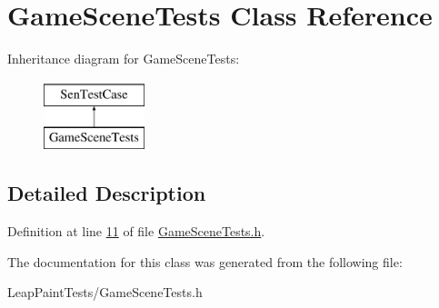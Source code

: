 \hypertarget{interface_game_scene_tests}{\section{Game\-Scene\-Tests Class Reference}
\label{d5/def/interface_game_scene_tests}
}
Inheritance diagram for Game\-Scene\-Tests\-:\begin{figure}[H]
\begin{center}
\leavevmode
\includegraphics[height=2.000000cm]{d5/def/interface_game_scene_tests}
\end{center}
\end{figure}


\subsection{Detailed Description}


Definition at line \hyperlink{_game_scene_tests_8h_source_l00011}{11} of file \hyperlink{_game_scene_tests_8h_source}{Game\-Scene\-Tests.\-h}.



The documentation for this class was generated from the following file\-:\begin{DoxyCompactItemize}
\item 
Leap\-Paint\-Tests/Game\-Scene\-Tests.\-h\end{DoxyCompactItemize}
